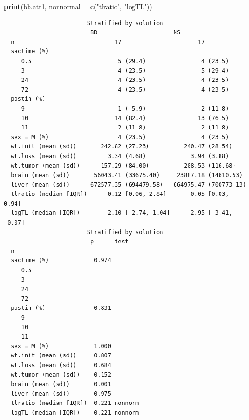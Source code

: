 \documentclass[]{book}
\newenvironment{Shaded}{\begin{snugshade}}{\end{snugshade}}
\newcommand{\KeywordTok}[1]{\textcolor[rgb]{0.13,0.29,0.53}{\textbf{#1}}}
\newcommand{\DataTypeTok}[1]{\textcolor[rgb]{0.13,0.29,0.53}{#1}}
\newcommand{\StringTok}[1]{\textcolor[rgb]{0.31,0.60,0.02}{#1}}
\newcommand{\NormalTok}[1]{#1}
\theoremstyle{definition}
\theoremstyle{definition}
\theoremstyle{definition}
\theoremstyle{remark}
\begin{document}
\begin{Shaded}
\begin{Highlighting}[]
\KeywordTok{print}\NormalTok{(bb.att1, }\DataTypeTok{nonnormal =} \KeywordTok{c}\NormalTok{(}\StringTok{"tlratio"}\NormalTok{, }\StringTok{"logTL"}\NormalTok{))}
\end{Highlighting}
\end{Shaded}

\begin{verbatim}
                        Stratified by solution
                         BD                      NS                      
  n                             17                      17               
  sactime (%)                                                            
     0.5                         5 (29.4)                4 (23.5)        
     3                           4 (23.5)                5 (29.4)        
     24                          4 (23.5)                4 (23.5)        
     72                          4 (23.5)                4 (23.5)        
  postin (%)                                                             
     9                           1 ( 5.9)                2 (11.8)        
     10                         14 (82.4)               13 (76.5)        
     11                          2 (11.8)                2 (11.8)        
  sex = M (%)                    4 (23.5)                4 (23.5)        
  wt.init (mean (sd))       242.82 (27.23)          240.47 (28.54)       
  wt.loss (mean (sd))         3.34 (4.68)             3.94 (3.88)        
  wt.tumor (mean (sd))      157.29 (84.00)          208.53 (116.68)      
  brain (mean (sd))       56043.41 (33675.40)     23887.18 (14610.53)    
  liver (mean (sd))      672577.35 (694479.58)   664975.47 (700773.13)   
  tlratio (median [IQR])      0.12 [0.06, 2.84]       0.05 [0.03, 0.94]  
  logTL (median [IQR])       -2.10 [-2.74, 1.04]     -2.95 [-3.41, -0.07]
                        Stratified by solution
                         p      test   
  n                                    
  sactime (%)             0.974        
     0.5                               
     3                                 
     24                                
     72                                
  postin (%)              0.831        
     9                                 
     10                                
     11                                
  sex = M (%)             1.000        
  wt.init (mean (sd))     0.807        
  wt.loss (mean (sd))     0.684        
  wt.tumor (mean (sd))    0.152        
  brain (mean (sd))       0.001        
  liver (mean (sd))       0.975        
  tlratio (median [IQR])  0.221 nonnorm
  logTL (median [IQR])    0.221 nonnorm
\end{verbatim}
\end{document}
